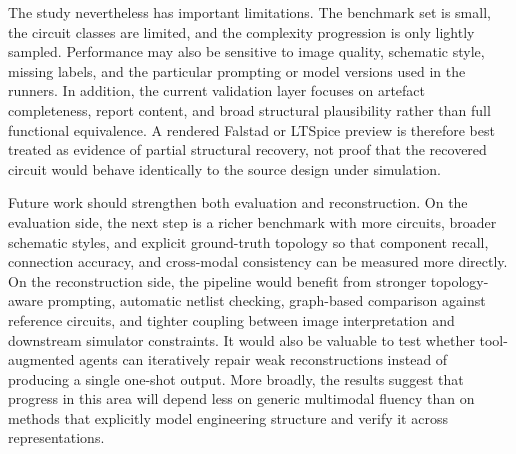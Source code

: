 The study nevertheless has important limitations. The benchmark set is small, the circuit classes are limited, and the complexity progression is only lightly sampled. Performance may also be sensitive to image quality, schematic style, missing labels, and the particular prompting or model versions used in the runners. In addition, the current validation layer focuses on artefact completeness, report content, and broad structural plausibility rather than full functional equivalence. A rendered Falstad or LTSpice preview is therefore best treated as evidence of partial structural recovery, not proof that the recovered circuit would behave identically to the source design under simulation.

Future work should strengthen both evaluation and reconstruction. On the evaluation side, the next step is a richer benchmark with more circuits, broader schematic styles, and explicit ground-truth topology so that component recall, connection accuracy, and cross-modal consistency can be measured more directly. On the reconstruction side, the pipeline would benefit from stronger topology-aware prompting, automatic netlist checking, graph-based comparison against reference circuits, and tighter coupling between image interpretation and downstream simulator constraints. It would also be valuable to test whether tool-augmented agents can iteratively repair weak reconstructions instead of producing a single one-shot output. More broadly, the results suggest that progress in this area will depend less on generic multimodal fluency than on methods that explicitly model engineering structure and verify it across representations.
